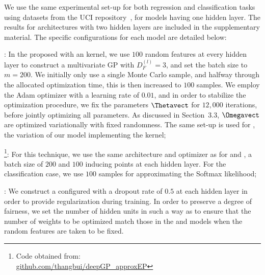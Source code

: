 We use the same experimental set-up for both regression and classification tasks using datasets from the UCI repository~\citep{Asuncion07}, for models having one hidden layer.
The results for architectures with two hidden layers are included in the supplementary material.
The specific configurations for each model are detailed below:
\begin{description}[style=unboxed,leftmargin=0.1cm]
\item[\dgprbf, \dgparc]: In the proposed \dgp with an \rbf kernel, we use $100$ random features at every hidden layer to construct a multivariate GP with $D_F^{(l)}=3$, and set the batch size to $m=200$.
We initially only use a single Monte Carlo sample, and halfway through the allocated optimization time, this is then increased to $100$ samples.
We employ the Adam optimizer with a learning rate of $0.01$, and in order to stabilize the optimization procedure, we fix the parameters $\Thetavect$ for $12,000$ iterations, before jointly optimizing all parameters.
As discussed in Section~3.3, $\Omegavect$ are optimized variationally with fixed randomness.
The same set-up is used for \dgparc, the variation of our model implementing the \arccosine kernel;
%
\item[\textsc{dgp-ep}]\footnote{Code obtained from: \\ \url{github.com/thangbui/deepGP_approxEP}}: 
For this technique, we use the same architecture and optimizer as for \dgprbf and \dgparc, a batch size of $200$ and $100$ inducing points at each hidden layer. %
For the classification case, we use $100$ samples for approximating the Softmax likelihood;
\item[\textsc{dnn}]: We construct a \dnn configured with a dropout rate of $0.5$ at each hidden layer in order to provide regularization during training.
In order to preserve a degree of fairness, we set the number of hidden units in such a way as to ensure that the number of weights to be optimized match those in the \dgprbf and \dgparc models when the random features are taken to be fixed. 
\end{description}

